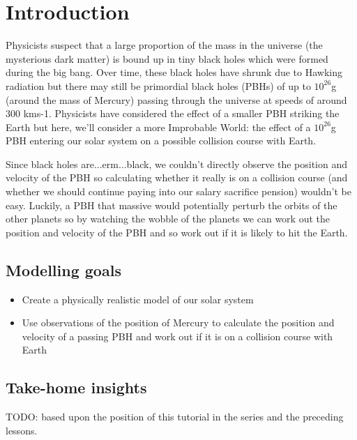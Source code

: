 \section{Introduction}

Physicists suspect that a large proportion of the mass in the universe (the
mysterious dark matter) is bound up in tiny black holes which were formed
during the big bang. Over time, these black holes have shrunk due to Hawking
radiation but there may still be primordial black holes (PBHs) of up to $10^{26}$g
(around the mass of Mercury) passing through the universe at speeds of around
300 kms-1. Physicists have considered the effect of a smaller PBH striking the
Earth but here, we'll consider a more Improbable World: the effect of a $10^{26}$g
PBH entering our solar system on a possible collision course with Earth.  

Since black holes are...erm...black, we couldn't directly observe the position
and velocity of the PBH so calculating whether it really is on a collision
course (and whether we should continue paying into our salary sacrifice
pension) wouldn't be easy. Luckily, a PBH that massive would potentially
perturb the orbits of the other planets so by watching the wobble of the
planets we can work out the position and velocity of the PBH and so work out if
it is likely to hit the Earth. 

\subsection{Modelling goals}

\begin{itemize}
\item Create a physically realistic model of our solar system
\item Use observations of the position of Mercury to calculate the position and
velocity of a passing PBH and work out if it is on a collision course with
Earth
\end{itemize}

\subsection{Take-home insights}

\color{red} TODO: based upon the position of this tutorial in the series and the 
preceding lessons. \color{black}
